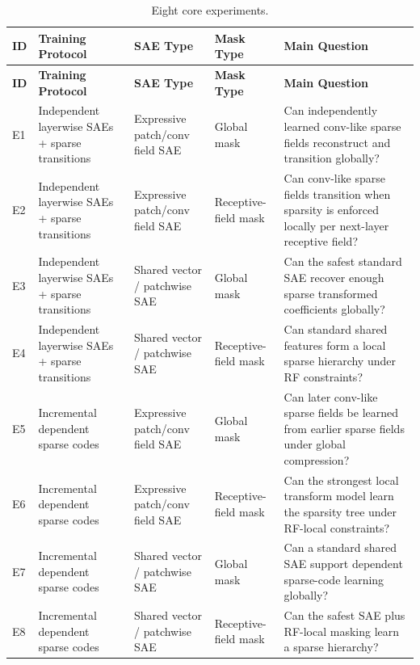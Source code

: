 \documentclass[11pt]{article}
\begin{document}
\begin{longtable}{p{}p{}p{}p{}p{}}
\caption{Eight core experiments.}\\
\toprule
\textbf{ID} & \textbf{Training Protocol} & \textbf{SAE Type} & \textbf{Mask Type} & \textbf{Main Question}\\
\midrule
\endfirsthead
\toprule
\textbf{ID} & \textbf{Training Protocol} & \textbf{SAE Type} & \textbf{Mask Type} & \textbf{Main Question}\\
\midrule
\endhead

E1 & Independent layerwise SAEs + sparse transitions & Expressive patch/conv field SAE & Global mask & Can independently learned conv-like sparse fields reconstruct and transition globally?\\
\addlinespace

E2 & Independent layerwise SAEs + sparse transitions & Expressive patch/conv field SAE & Receptive-field mask & Can conv-like sparse fields transition when sparsity is enforced locally per next-layer receptive field?\\
\addlinespace

E3 & Independent layerwise SAEs + sparse transitions & Shared vector / patchwise SAE & Global mask & Can the safest standard SAE recover enough sparse transformed coefficients globally?\\
\addlinespace

E4 & Independent layerwise SAEs + sparse transitions & Shared vector / patchwise SAE & Receptive-field mask & Can standard shared features form a local sparse hierarchy under RF constraints?\\
\addlinespace

E5 & Incremental dependent sparse codes & Expressive patch/conv field SAE & Global mask & Can later conv-like sparse fields be learned from earlier sparse fields under global compression?\\
\addlinespace

E6 & Incremental dependent sparse codes & Expressive patch/conv field SAE & Receptive-field mask & Can the strongest local transform model learn the sparsity tree under RF-local constraints?\\
\addlinespace

E7 & Incremental dependent sparse codes & Shared vector / patchwise SAE & Global mask & Can a standard shared SAE support dependent sparse-code learning globally?\\
\addlinespace

E8 & Incremental dependent sparse codes & Shared vector / patchwise SAE & Receptive-field mask & Can the safest SAE plus RF-local masking learn a sparse hierarchy?\\

\bottomrule
\end{longtable}
\end{document}
